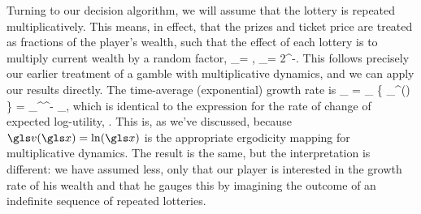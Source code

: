 
Turning to our decision algorithm, we will assume that the lottery is repeated multiplicatively. This means, in effect, that the prizes and ticket price are treated as fractions of the player's wealth, such that the effect of each lottery is to multiply current wealth by a random factor,
\be
\gr_\gj = , \quad \p_\gj= 2^{-\gj}.
\ee
This follows precisely our earlier treatment of a gamble with multiplicative dynamics, and we can apply our results directly. 
The time-average (exponential) growth rate is
\be
\gt_ =  \lim_{\T\to\infty} \left\{   \sum_{}^\T \ln \gr(\gtau) \right\} =   \sum_{}^^{-\gj} \ln \gr_\gj, 
\ee
which is identical to the expression for the rate of change of expected log-utility, 
. This is, as we've discussed, because $\gv(\x)=\ln(\x)$ 
is the appropriate ergodicity mapping for multiplicative dynamics. The result is the same, but 
the interpretation is different: we have assumed less, only that our player is 
interested in the growth rate of his wealth and that he gauges this by imagining 
the outcome of an indefinite sequence of repeated lotteries.


